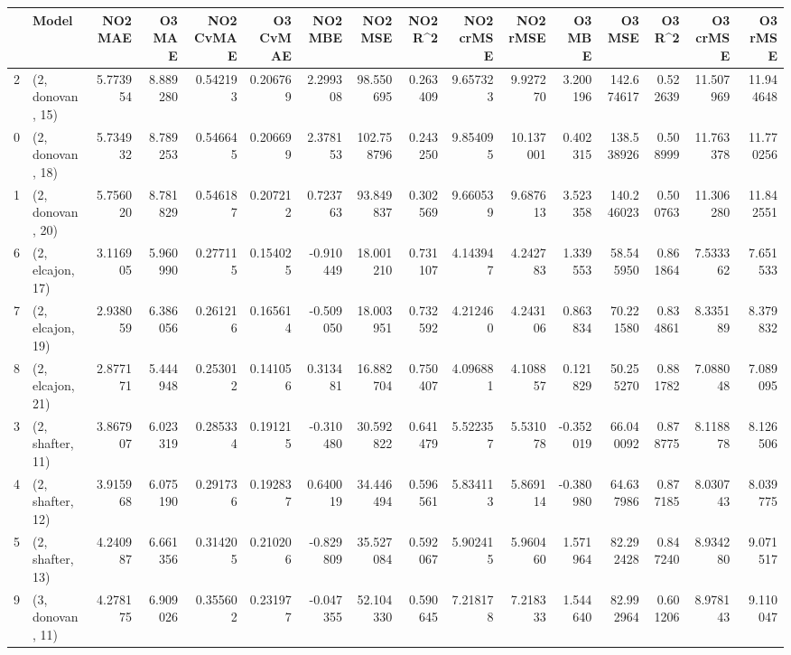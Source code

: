 \begin{tabular}{llrrrrrrrrrrrrrr}
\toprule
{} &             Model &   NO2 MAE &     O3 MAE &  NO2 CvMAE &  O3 CvMAE &   NO2 MBE &     NO2 MSE &   NO2 R\textasciicircum2 &  NO2 crMSE &   NO2 rMSE &    O3 MBE &      O3 MSE &    O3 R\textasciicircum2 &   O3 crMSE &    O3 rMSE \\
\midrule
2  &  (2, donovan, 15) &  5.773954 &   8.889280 &   0.542193 &  0.206769 &  2.299308 &   98.550695 &  0.263409 &   9.657323 &   9.927270 &  3.200196 &  142.674617 &  0.522639 &  11.507969 &  11.944648 \\
0  &  (2, donovan, 18) &  5.734932 &   8.789253 &   0.546645 &  0.206699 &  2.378153 &  102.758796 &  0.243250 &   9.854095 &  10.137001 &  0.402315 &  138.538926 &  0.508999 &  11.763378 &  11.770256 \\
1  &  (2, donovan, 20) &  5.756020 &   8.781829 &   0.546187 &  0.207212 &  0.723763 &   93.849837 &  0.302569 &   9.660539 &   9.687613 &  3.523358 &  140.246023 &  0.500763 &  11.306280 &  11.842551 \\
6  &  (2, elcajon, 17) &  3.116905 &   5.960990 &   0.277115 &  0.154025 & -0.910449 &   18.001210 &  0.731107 &   4.143947 &   4.242783 &  1.339553 &   58.545950 &  0.861864 &   7.533362 &   7.651533 \\
7  &  (2, elcajon, 19) &  2.938059 &   6.386056 &   0.261216 &  0.165614 & -0.509050 &   18.003951 &  0.732592 &   4.212460 &   4.243106 &  0.863834 &   70.221580 &  0.834861 &   8.335189 &   8.379832 \\
8  &  (2, elcajon, 21) &  2.877171 &   5.444948 &   0.253012 &  0.141056 &  0.313481 &   16.882704 &  0.750407 &   4.096881 &   4.108857 &  0.121829 &   50.255270 &  0.881782 &   7.088048 &   7.089095 \\
3  &  (2, shafter, 11) &  3.867907 &   6.023319 &   0.285334 &  0.191215 & -0.310480 &   30.592822 &  0.641479 &   5.522357 &   5.531078 & -0.352019 &   66.040092 &  0.878775 &   8.118878 &   8.126506 \\
4  &  (2, shafter, 12) &  3.915968 &   6.075190 &   0.291736 &  0.192837 &  0.640019 &   34.446494 &  0.596561 &   5.834113 &   5.869114 & -0.380980 &   64.637986 &  0.877185 &   8.030743 &   8.039775 \\
5  &  (2, shafter, 13) &  4.240987 &   6.661356 &   0.314205 &  0.210206 & -0.829809 &   35.527084 &  0.592067 &   5.902415 &   5.960460 &  1.571964 &   82.292428 &  0.847240 &   8.934280 &   9.071517 \\
9  &  (3, donovan, 11) &  4.278175 &   6.909026 &   0.355602 &  0.231977 & -0.047355 &   52.104330 &  0.590645 &   7.218178 &   7.218333 &  1.544640 &   82.992964 &  0.601206 &   8.978143 &   9.110047 \\

\end{tabular}
